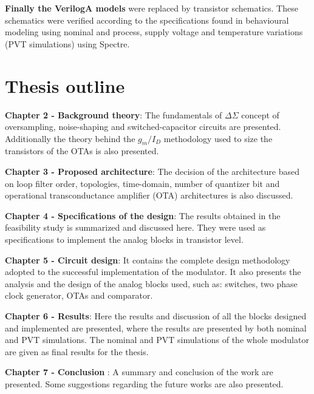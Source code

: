 \textbf{Finally the VerilogA models} were replaced by transistor schematics. These schematics were verified according to the specifications found in behavioural modeling using nominal and process, supply voltage and temperature variations (PVT simulations) using Spectre. 

\section{Thesis outline}

\textbf{Chapter 2 - Background theory}: The fundamentals of $\Delta\Sigma$ concept of oversampling, noise-shaping and switched-capacitor circuits are presented. Additionally the theory behind the $g_m/I_D$ methodology used to size the transistors of the OTAs is also presented. 

\textbf{Chapter 3 - Proposed architecture}: The decision of the architecture based on loop filter order, topologies, time-domain, number of quantizer bit and operational transconductance amplifier (OTA) architectures is also discussed. 

\textbf{Chapter 4 - Specifications of the design}:
The results obtained in the feasibility study is summarized and discussed here. They were used as specifications to implement the analog blocks in transistor level. 

\textbf{Chapter 5 - Circuit design}: It contains the complete design methodology adopted to the successful implementation of the modulator. It also presents the analysis and the design of the analog blocks used, such as: switches, two phase clock generator, OTAs and comparator.    

\textbf{Chapter 6 - Results}: Here the results and discussion of all the blocks designed and implemented are presented, where the results are presented by both nominal and PVT simulations. The nominal and PVT simulations of the whole modulator are given as final results for the thesis. 

\textbf{Chapter 7 - Conclusion} : A summary and conclusion of the work are presented. Some suggestions regarding the future works are also presented. 